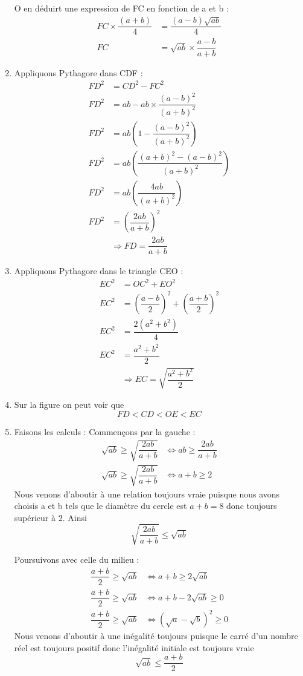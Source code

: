 \begin{enumerate}[label=C\arabic*)]
		O en déduirt une expression de FC en fonction de a et b :
		\begin{align*}
			FC\times \dfrac{(a + b)}{4} &= \dfrac{(a - b)\sqrt{ab}}{4}\\
			FC &= \sqrt{ab}\times\dfrac{a - b}{a + b}
		\end{align*}
	\item Appliquons Pythagore dans CDF : 
		\begin{align*}
			FD^2 &= CD^2 - FC^2\\
			FD^2 &= ab - ab \times\dfrac{(a - b)^2}{(a + b)^2} \\
			FD^2 &= ab\left( 1 - \dfrac{(a - b)^2}{(a + b)^2}\right) \\
			FD^2 &= ab\left( \dfrac{(a + b)^2 - (a - b)^2}{(a + b)^2}\right) \\
			FD^2 &= ab\left( \dfrac{4ab}{(a + b)^2}\right) \\
			FD^2 &= \left(\dfrac{2ab}{a + b}\right)^2\\
			 &\Rightarrow \boxed{FD = \dfrac{2ab}{a + b}}
		\end{align*}
	\item Appliquons Pythagore dans le triangle CEO :
		\begin{align*}
			EC^2 &= OC^2 + EO^2 \\
			EC^2 &= \left(\dfrac{a - b}{2}\right)^2 + \left(\dfrac{a + b}{2}\right)^2 \\
			EC^2 &= \dfrac{2(a^2 + b^2)}{4} \\
			EC^2 &= \dfrac{a^2 + b^2}{2} \\
			&\Rightarrow \boxed{EC = \sqrt{\dfrac{a^2 + b^2}{2}}}
		\end{align*}
	\item Sur la figure on peut voir que \[FD < CD < OE < EC\]
	\item Faisons les calculs :
		Commençons par la gauche : 
		\begin{align*}
			\sqrt{ab} \geq \sqrt{\dfrac{2ab}{a + b}} &\iff ab \geq  \dfrac{2ab}{a + b} \\
			\sqrt{ab} \geq \sqrt{\dfrac{2ab}{a + b}} &\iff a + b \geq  2 
		\end{align*}
		Nous venons d'aboutir à une relation toujours vraie puisque nous avons choisis a et b tels que le diamètre du cercle est $a + b = 8$ donc toujours supérieur à 2. Ainsi 
		\[\boxed{\sqrt{\dfrac{2ab}{a + b}} \leq \sqrt{ab}}\]
		
		Poursuivons avec celle du milieu : 
		\begin{align*}
			\dfrac{a + b}{2} \geq \sqrt{ab} &\iff a + b \geq 2\sqrt{ab}\\
			\dfrac{a + b}{2} \geq \sqrt{ab} &\iff a + b - 2\sqrt{ab} \geq 0\\
			\dfrac{a + b}{2} \geq \sqrt{ab} &\iff (\sqrt{a} - \sqrt{b})^2 \geq 0
		\end{align*}
		Nous venons d'aboutir à une inégalité toujours puisque le carré d'un nombre réel est toujours positif donc l'inégalité initiale est toujours vraie \[\boxed{\sqrt{ab} \leq \dfrac{a+b}{2}}\]
		

\end{enumerate}
